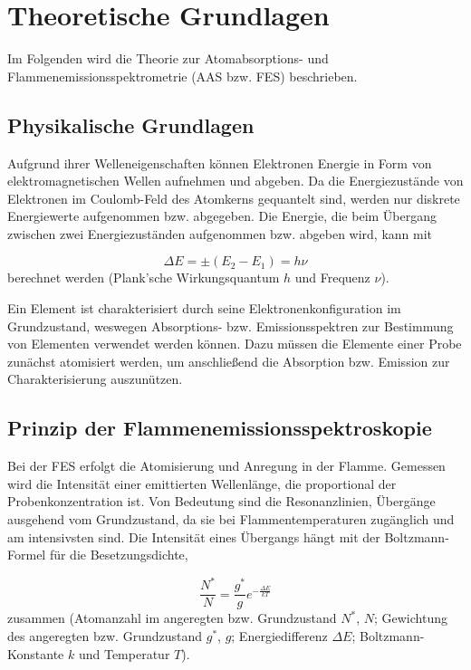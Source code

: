 \section{Theoretische Grundlagen}

  Im Folgenden wird die Theorie zur Atomabsorptions- und Flammenemissionsspektrometrie (AAS bzw. FES) beschrieben. 
  
  \subsection{Physikalische Grundlagen}
  
    Aufgrund ihrer Welleneigenschaften können Elektronen Energie in Form von elektromagnetischen Wellen aufnehmen und abgeben. Da die Energiezustände von Elektronen im Coulomb-Feld des Atomkerns gequantelt sind, werden nur diskrete Energiewerte aufgenommen bzw. abgegeben. Die Energie, die beim Übergang zwischen zwei Energiezuständen aufgenommen bzw. abgeben wird, kann mit
    
      \begin{equation}
        \Delta E = \pm \left(E_2 - E_1\right) = h \nu
      \end{equation}
    berechnet werden (Plank'sche Wirkungsquantum $h$ und Frequenz $\nu$). \citep[S. 100-102]{PhysikIII}
    
    Ein Element ist charakterisiert durch seine Elektronenkonfiguration im Grundzustand, weswegen Absorptions- bzw. Emissionsspektren zur  Bestimmung von Elementen verwendet werden können. Dazu müssen die Elemente einer Probe zunächst atomisiert werden, um anschließend die Absorption bzw. Emission zur Charakterisierung auszunützen. \citep[S. 82]{Taschenatlas}
  
  \subsection{Prinzip der Flammenemissionsspektroskopie}
    
    Bei der FES erfolgt die Atomisierung und Anregung in der Flamme. Gemessen wird die Intensität einer emittierten Wellenlänge, die proportional der Probenkonzentration ist. Von Bedeutung sind die Resonanzlinien, Übergänge ausgehend vom Grundzustand, da sie bei  Flammentemperaturen zugänglich und am intensivsten sind. Die Intensität eines Übergangs hängt mit der Boltzmann-Formel für die Besetzungsdichte,
    
      \begin{equation}
        \frac{N^*}{N} = \frac{g^*}{g} e^{-\frac{\Delta E}{kT}}
      \end{equation}
    zusammen (Atomanzahl im angeregten bzw. Grundzustand $N^*$, $N$; Gewichtung des angeregten bzw. Grundzustand $g^*$, $g$; Energiedifferenz $\Delta E$; Boltzmann-Konstante $k$ und Temperatur $T$). \citep{Versuchsvorschrift}
    

